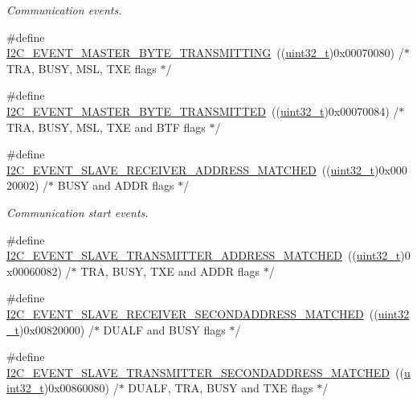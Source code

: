 \begin{DoxyCompactItemize}
\begin{DoxyCompactList}\small\item\em Communication events. \end{DoxyCompactList}\item 
\#define \hyperlink{group___i2_c___events_ga037ac1e67e44ee085acac6f034bd73b2}{I2\+C\+\_\+\+E\+V\+E\+N\+T\+\_\+\+M\+A\+S\+T\+E\+R\+\_\+\+B\+Y\+T\+E\+\_\+\+T\+R\+A\+N\+S\+M\+I\+T\+T\+I\+NG}~((\hyperlink{_p_e___types_8h_a33594304e786b158f3fb30289278f5af}{uint32\+\_\+t})0x00070080) /$\ast$ T\+R\+A, B\+U\+S\+Y, M\+S\+L, T\+X\+E flags $\ast$/
\item 
\#define \hyperlink{group___i2_c___events_ga8fe3b96b54e3c38e1de5d48536039c8f}{I2\+C\+\_\+\+E\+V\+E\+N\+T\+\_\+\+M\+A\+S\+T\+E\+R\+\_\+\+B\+Y\+T\+E\+\_\+\+T\+R\+A\+N\+S\+M\+I\+T\+T\+ED}~((\hyperlink{_p_e___types_8h_a33594304e786b158f3fb30289278f5af}{uint32\+\_\+t})0x00070084)  /$\ast$ T\+R\+A, B\+U\+S\+Y, M\+S\+L, T\+X\+E and B\+T\+F flags $\ast$/
\item 
\#define \hyperlink{group___i2_c___events_ga6cf0e334704618b024eee604849f50f7}{I2\+C\+\_\+\+E\+V\+E\+N\+T\+\_\+\+S\+L\+A\+V\+E\+\_\+\+R\+E\+C\+E\+I\+V\+E\+R\+\_\+\+A\+D\+D\+R\+E\+S\+S\+\_\+\+M\+A\+T\+C\+H\+ED}~((\hyperlink{_p_e___types_8h_a33594304e786b158f3fb30289278f5af}{uint32\+\_\+t})0x00020002) /$\ast$ B\+U\+S\+Y and A\+D\+D\+R flags $\ast$/
\begin{DoxyCompactList}\small\item\em Communication start events. \end{DoxyCompactList}\item 
\#define \hyperlink{group___i2_c___events_ga3fa381c1fd9a95c8ae13c6cc402b1327}{I2\+C\+\_\+\+E\+V\+E\+N\+T\+\_\+\+S\+L\+A\+V\+E\+\_\+\+T\+R\+A\+N\+S\+M\+I\+T\+T\+E\+R\+\_\+\+A\+D\+D\+R\+E\+S\+S\+\_\+\+M\+A\+T\+C\+H\+ED}~((\hyperlink{_p_e___types_8h_a33594304e786b158f3fb30289278f5af}{uint32\+\_\+t})0x00060082) /$\ast$ T\+R\+A, B\+U\+S\+Y, T\+X\+E and A\+D\+D\+R flags $\ast$/
\item 
\#define \hyperlink{group___i2_c___events_ga17e78ab01fa980b3df10f8d9f6864c48}{I2\+C\+\_\+\+E\+V\+E\+N\+T\+\_\+\+S\+L\+A\+V\+E\+\_\+\+R\+E\+C\+E\+I\+V\+E\+R\+\_\+\+S\+E\+C\+O\+N\+D\+A\+D\+D\+R\+E\+S\+S\+\_\+\+M\+A\+T\+C\+H\+ED}~((\hyperlink{_p_e___types_8h_a33594304e786b158f3fb30289278f5af}{uint32\+\_\+t})0x00820000)  /$\ast$ D\+U\+A\+L\+F and B\+U\+S\+Y flags $\ast$/
\item 
\#define \hyperlink{group___i2_c___events_ga6221aa204356bec9146f800ccfc99fc1}{I2\+C\+\_\+\+E\+V\+E\+N\+T\+\_\+\+S\+L\+A\+V\+E\+\_\+\+T\+R\+A\+N\+S\+M\+I\+T\+T\+E\+R\+\_\+\+S\+E\+C\+O\+N\+D\+A\+D\+D\+R\+E\+S\+S\+\_\+\+M\+A\+T\+C\+H\+ED}~((\hyperlink{_p_e___types_8h_a33594304e786b158f3fb30289278f5af}{uint32\+\_\+t})0x00860080)  /$\ast$ D\+U\+A\+L\+F, T\+R\+A, B\+U\+S\+Y and T\+X\+E flags $\ast$/

\end{DoxyCompactItemize}
